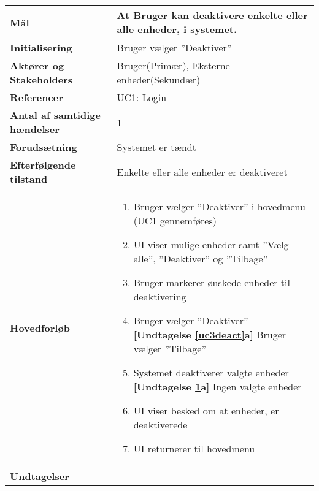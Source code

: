 \begin{table}[H] \centering
	\label{tab:UC3}
\begin{tabular}{|p{6cm}|p{8cm}|}
	\hline
		\textbf{Mål}						&At Bruger kan deaktivere enkelte eller alle enheder, i systemet. \\\hline
		\textbf{Initialisering} 			&Bruger vælger ''Deaktiver'' \\ \hline
		\textbf{Aktører og Stakeholders}	&Bruger(Primær), Eksterne enheder(Sekundær)\\ \hline
		\textbf{Referencer} 				&UC1: Login \\ \hline
		\textbf{Antal af samtidige hændelser} &1 \\ \hline
		\textbf{Forudsætning} 			&Systemet er tændt \\ \hline
		\textbf{Efterfølgende tilstand} 	&Enkelte eller alle enheder er deaktiveret \\ \hline
		\textbf{Hovedforløb}				&

	\begin{enumerate}	
						
					
				\item Bruger vælger ''Deaktiver'' i hovedmenu (UC1 gennemføres)
										
				\item \label{uc3menu}UI viser mulige enheder samt ''Vælg alle'', ''Deaktiver''  og ''Tilbage''
												
				\item Bruger markerer ønskede enheder til deaktivering
												
				\item \label{uc3deact} Bruger vælger ''Deaktiver''\newline
					\textbf{[Undtagelse \ref{uc3deact}a]} Bruger vælger ''Tilbage''
												
				\item \label{uc3sysdeact} Systemet deaktiverer valgte enheder \newline
					\textbf{[Undtagelse \ref{uc3sysdeact}a]} Ingen valgte enheder
				
				\item UI viser besked om at enheder, er deaktiverede
																	
				\item UI returnerer til hovedmenu	
	
	\end{enumerate} \\ \hline

		\textbf{Undtagelser}	
		

\end{tabular}
\end{table}
